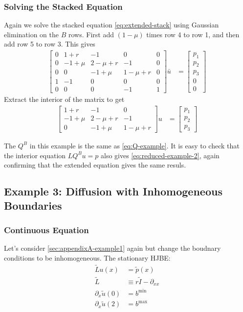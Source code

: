 \documentclass[11pt]{article}
\newcommand{\D}[1][]{\ensuremath{\partial_{#1}}}
\begin{document}
\subsubsection{Solving the Stacked Equation}
Again we solve the stacked equation \cref{eq:extended-stack} using Gaussian elimination on the $B$ rows. First add $(1-\mu)$ times row 4 to row 1, and then add row 5 to row 3. This gives
\begin{align}
	\begin{bmatrix}
		0 & 1 + r & -1 & 0 & 0\\
		0 & -1 + \mu & 2 - \mu +r & -1 & 0\\
		0 & 0 & -1 + \mu & 1 - \mu +r & 0\\
		1 & -1 & 0 & 0 & 0\\
		0 & 0 & 0 & -1 & 1
	\end{bmatrix} \bar{u} &= \begin{bmatrix} p_1 \\ p_2 \\ p_3 \\ 0 \\ 0\end{bmatrix}
\end{align}
Extract the interior of the matrix to get
\begin{align}
	\begin{bmatrix}
		1 + r & -1 & 0\\
		-1 + \mu & 2 - \mu +r & -1\\
		0 & -1 + \mu & 1 - \mu +r
	\end{bmatrix} u &= \begin{bmatrix} p_1 \\ p_2 \\ p_3\end{bmatrix}\label{eq:reduced-example-2}
\end{align}

The $Q^B$ in this example is the same as \cref{eq:Q-example}. It is easy to check that the interior equation $LQ^Bu = p$ also gives \cref{eq:reduced-example-2}, again confirming that the extended equation gives the same resuls.

\subsection{Example 3: Diffusion with Inhomogeneous Boundaries}\label{sec:appendixA-example3}
\subsubsection{Continuous Equation}
Let's consider \ref{sec:appendixA-example1} again but change the boudnary conditions to be inhomogeneous. The stationary HJBE:
\begin{align}
	\tilde{L}u(x) &= \tilde{p}(x)\\
	\tilde{L} &\equiv r\tilde{I} - \D[xx] \\
	\D[x]\tilde{u}(0) &= b^{\min}\\
	\D[x]\tilde{u}(2) &= b^{\max}
\end{align}
\end{document}
